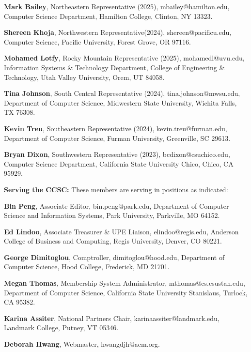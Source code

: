 \documentclass{article}
\begin{document}
\begin{multicols}{2}
\begin{raggedright}
{\noindent
\textbf{Mark Bailey}, Northeastern Representative (2025), mbailey@hamilton.edu, Computer Science Department, Hamilton College, Clinton, NY 13323.

\noindent
\textbf{Shereen Khoja},	Northwestern Representative(2024), shereen@pacificu.edu,
Computer Science, Pacific University, Forest Grove, OR 97116.

\noindent
\textbf{Mohamed Lotfy}, Rocky Mountain Representative (2025),
mohamedl@uvu.edu, Information Systems \& Technology Department,
College of Engineering \& Technology, Utah Valley University, Orem, UT 84058.

\noindent
\textbf{Tina Johnson}, South Central Representative (2024),
tina.johnson@mwsu.edu, Department of Computer Science, Midwestern State University, Wichita Falls, TX 76308.

\noindent
\textbf{Kevin Treu}, Southeastern Representative (2024),
kevin.treu@furman.edu, Department of Computer Science, Furman University, Greenville,
SC 29613.

\noindent
\textbf{Bryan Dixon}, Southwestern Representative (2023),
bcdixon@csuchico.edu, Computer Science Department, California State University Chico, Chico, CA 95929.

\clearpage
\vspace{0.2in}
\noindent
\textbf{Serving the CCSC:} These members are serving in positions as indicated:

\noindent
\textbf{Bin Peng}, Associate Editor,
bin.peng@park.edu, Department of Computer Science and
Information Systems, Park University, Parkville, MO 64152.

\noindent
\textbf{Ed Lindoo}, Associate Treasurer \& UPE Liaison, elindoo@regis.edu,
Anderson College of Business and Computing, Regis University, Denver, CO 80221.

\noindent
\textbf{George Dimitoglou}, Comptroller,
dimitoglou@hood.edu,
Department of Computer Science, Hood College, Frederick, MD 21701.

\noindent
\textbf{Megan Thomas}, Membership System Administrator,
mthomas@cs.csustan.edu, Department of Computer Science, California State University Stanislaus, Turlock, CA 95382.

\noindent
\textbf{Karina Assiter}, National Partners Chair, karinaassiter@landmark.edu, Landmark College, Putney, VT 05346.

\noindent
\textbf{Deborah Hwang}, Webmaster, hwangdjh@acm.org.

} %

\end{raggedright}
\end{multicols}
\end{document}
